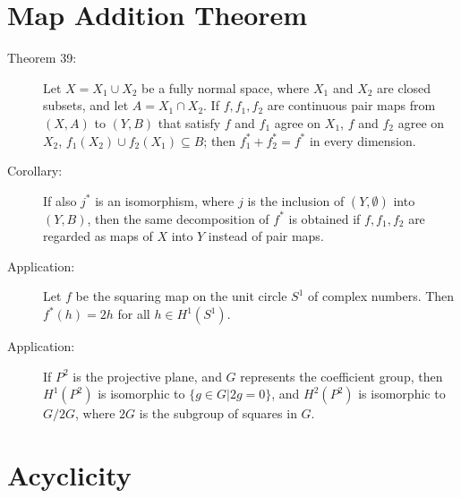 \documentclass{article}
\begin{document}
\section{Map Addition Theorem}

\begin{description}

\item[Theorem 39:] Let $X = X_1 \cup X_2$ be a fully normal space, where $X_1$ and $X_2$ are closed subsets, and let $A = X_1 \cap X_2$. If $f,f_1,f_2$ are continuous pair maps from $(X,A)$ to $(Y,B)$ that satisfy $f$ and $f_1$ agree on $X_1$, $f$ and $f_2$ agree on $X_2$, $f_1 (X_2) \cup f_2 (X_1) \subseteq B$; then $f_1^* + f_2^* = f^*$ in every dimension.

\item[Corollary:] If also $j^*$ is an isomorphism, where $j$ is the inclusion of $(Y,\emptyset)$ into $(Y,B)$, then the same decomposition of $f^*$ is obtained if $f,f_1,f_2$ are regarded as maps of $X$ into $Y$ instead of pair maps.

\item[Application:] Let $f$ be the squaring map on the unit circle $S^1$ of complex numbers. Then $f^*(h)=2h$ for all $h \in H^1(S^1)$.

\item[Application:] If $P^2$ is the projective plane, and $G$ represents the coefficient group, then $H^1(P^2)$ is isomorphic to $\{ g \in G \vert 2g = 0 \}$, and $H^2(P^2)$ is isomorphic to $G/2G$, where $2G$ is the subgroup of squares in $G$.

\end{description}



\section{Acyclicity}
\end{document}
